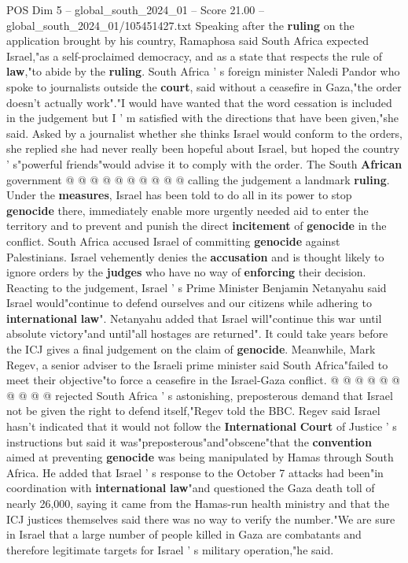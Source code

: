 \begin{textsample}{POS Dim 5 – global\_south\_2024\_01 – Score 21.00 – global\_south\_2024\_01/105451427.txt}
Speaking after the \textbf{ruling} on the application brought by his country, Ramaphosa said South Africa expected Israel,"as a self-proclaimed democracy, and as a state that respects the rule of \textbf{law},"to abide by the \textbf{ruling}.
South Africa ' s foreign minister Naledi Pandor who spoke to journalists outside the \textbf{court}, said without a ceasefire in Gaza,"the order doesn't actually work"."I would have wanted that the word cessation is included in the judgement but I ' m satisfied with the directions that have been given,"she said.
Asked by a journalist whether she thinks Israel would conform to the orders, she replied she had never really been hopeful about Israel, but hoped the country ' s"powerful friends"would advise it to comply with the order.
The South \textbf{African} government @ @ @ @ @ @ @ @ @ @ calling the judgement a landmark \textbf{ruling}.
Under the \textbf{measures}, Israel has been told to do all in its power to stop \textbf{genocide} there, immediately enable more urgently needed aid to enter the territory and to prevent and punish the direct \textbf{incitement} of \textbf{genocide} in the conflict.
South Africa accused Israel of committing \textbf{genocide} against Palestinians.
Israel vehemently denies the \textbf{accusation} and is thought likely to ignore orders by the \textbf{judges} who have no way of \textbf{enforcing} their decision.
Reacting to the judgement, Israel ' s Prime Minister Benjamin Netanyahu said Israel would"continue to defend ourselves and our citizens while adhering to \textbf{international} \textbf{law}".
Netanyahu added that Israel will"continue this war until absolute victory"and until"all hostages are returned".
It could take years before the ICJ gives a final judgement on the claim of \textbf{genocide}.
Meanwhile, Mark Regev, a senior adviser to the Israeli prime minister said South Africa"failed to meet their objective"to force a ceasefire in the Israel-Gaza conflict. @ @ @ @ @ @ @ @ @ @ rejected South Africa ' s astonishing, preposterous demand that Israel not be given the right to defend itself,"Regev told the BBC.
Regev said Israel hasn't indicated that it would not follow the \textbf{International} \textbf{Court} of Justice ' s instructions but said it was"preposterous"and"obscene"that the \textbf{convention} aimed at preventing \textbf{genocide} was being manipulated by Hamas through South Africa.
He added that Israel ' s response to the October 7 attacks had been"in coordination with \textbf{international} \textbf{law}"and questioned the Gaza death toll of nearly 26,000, saying it came from the Hamas-run health ministry and that the ICJ justices themselves said there was no way to verify the number."We are sure in Israel that a large number of people killed in Gaza are combatants and therefore legitimate targets for Israel ' s military operation,"he said.

\end{textsample}
